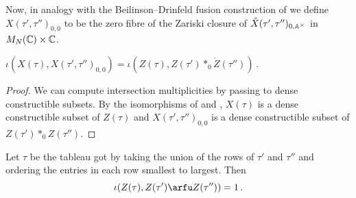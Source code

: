 \documentclass{article} %
\begin{document}
Now, in analogy with the Beilinson--Drinfeld fusion construction of 
we define $X(\tau', \tau'')_{0,0} $ to be the zero fibre of the Zariski closure of $\mathring X(\tau',\tau'')_{0,\AA^\times}$ in $M_N(\CC)\times\CC$. 
% 
\begin{corollary}
\label{cor:iota}
    $\iota(X(\tau), X(\tau',\tau'')_{0,0}) = \iota( Z(\tau), Z(\tau')\ast_0 \mathring Z(\tau''))\,.$
\end{corollary}
%


\begin{proof}
We can compute intersection multiplicities by passing to dense constructible subsets.  By
the isomorphisms of  and , $X(\tau) $ is a dense constructible subset of $ Z(\tau) $ and $ X(\tau', \tau'')_{0,0} $ is a dense constructible subset of $ Z(\tau') \ast_0 Z(\tau'') $.
%  
\end{proof}
% 
\begin{conjecture}
    Let $\tau$ be the tableau got by taking the union of the rows of $\tau'$ and $\tau''$ and ordering the entries in each row smallest to largest. 
    Then 
    \begin{equation}
        \iota(Z(\tau), Z(\tau') \arfu Z(\tau'')) = 1 \,. 
    \end{equation}
\end{conjecture}
% 
% 
% 
\end{document}

